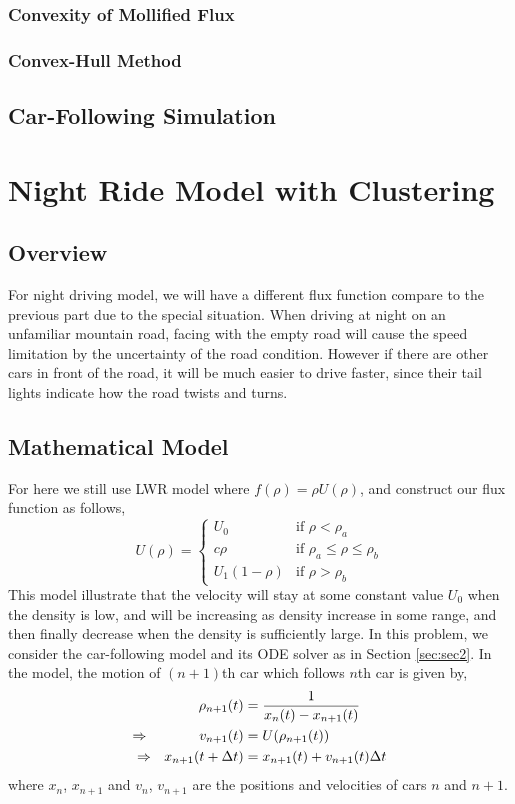 \documentclass[10pt]{article}
\begin{document}
\subsubsection{Convexity of Mollified Flux}
\subsubsection{Convex-Hull Method}
\subsection{Car-Following Simulation}
\section{Night Ride Model with Clustering}
\subsection{Overview}

For night driving model, we will have a different flux function compare to the previous part due to the special situation. When driving at night on an unfamiliar mountain road, facing with the empty road will cause the speed limitation by the uncertainty of the road condition.
However if there are other cars in front of the road, it will be much easier to drive faster, since their tail lights indicate how the road twists and turns.
\subsection{Mathematical Model}

For here we still use LWR model where $f(\rho)=\rho U(\rho)$, and construct our flux function as follows,
\[U(\rho)=\left\{\begin{array}{lll}U_0&\text{if }\rho<\rho_a\\c\rho&\text{if }\rho_a\leq\rho\leq\rho_b\\U_1(1-\rho)&\text{if }\rho>\rho_b\end{array}\right.\]
This model illustrate that the velocity will stay at some constant value $U_0$ when the density is low, and will be increasing as density increase in some range, and then finally decrease when the density is sufficiently large.
\vskip 8pt
In this problem, we consider the car-following model and its ODE solver as in Section \ref{sec:sec2}. In the model, the motion of $(n+1)$th car which follows $n$th car is given by,
\begin{align*}
\rho_{n+1}(t) &= \frac{1}{x_n(t)-x_{n+1}(t)}\\
\Rightarrow\hskip35ptv_{n+1}(t)&=U(\rho_{n+1}(t))\\
\Rightarrow~~x_{n+1}(t+\Delta t)&=x_{n+1}(t)+v_{n+1}(t)\Delta t
\end{align*}
where $x_n$, $x_{n+1}$ and $v_n$, $v_{n+1}$ are the positions and velocities of cars $n$ and $n+1$.
\end{document}

